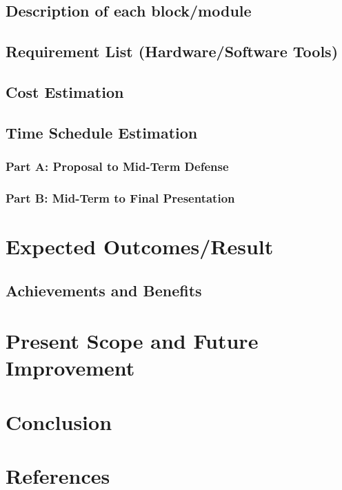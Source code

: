 \documentclass{article}
\begin{document}
\subsection{Description of each block/module}
\cleardoublepage

\subsection{Requirement List (Hardware/Software Tools)}
\cleardoublepage

\subsection{Cost Estimation}
\cleardoublepage

\subsection{Time Schedule Estimation}
\cleardoublepage
\subsubsection{Part A: Proposal to Mid-Term Defense}
\cleardoublepage
\subsubsection{Part B: Mid-Term to Final Presentation}
\cleardoublepage

\section{Expected Outcomes/Result}
\cleardoublepage
\subsection{Achievements and Benefits}
\cleardoublepage

\section{Present Scope and Future Improvement}
\cleardoublepage

\section{Conclusion}
\cleardoublepage
\section*{References}


\nocite{*}
\end{document}
